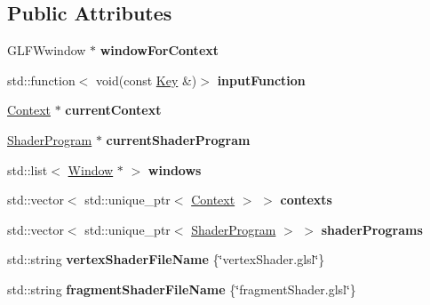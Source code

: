 \subsection*{Public Attributes}
\begin{DoxyCompactItemize}
\item 
G\+L\+F\+Wwindow $\ast$ {\bfseries window\+For\+Context}\hypertarget{classMyGL_ad9da207aec683d4e52190aa6ca4c8103}{}\label{classMyGL_ad9da207aec683d4e52190aa6ca4c8103}

\item 
std\+::function$<$ void(const \hyperlink{classKey}{Key} \&)$>$ {\bfseries input\+Function}\hypertarget{classMyGL_aa729ce3c2c4c45a960ae17ac53d46585}{}\label{classMyGL_aa729ce3c2c4c45a960ae17ac53d46585}

\item 
\hyperlink{classContext}{Context} $\ast$ {\bfseries current\+Context}\hypertarget{classMyGL_a64f2144f0057b9b37b14ebc9a94d4f75}{}\label{classMyGL_a64f2144f0057b9b37b14ebc9a94d4f75}

\item 
\hyperlink{classShaderProgram}{Shader\+Program} $\ast$ {\bfseries current\+Shader\+Program}\hypertarget{classMyGL_ae0a53010a55ec6920697018b90df6ee2}{}\label{classMyGL_ae0a53010a55ec6920697018b90df6ee2}

\item 
std\+::list$<$ \hyperlink{classWindow}{Window} $\ast$ $>$ {\bfseries windows}\hypertarget{classMyGL_ab7bc049b7ce8d79fe244a1dbd2e63bf0}{}\label{classMyGL_ab7bc049b7ce8d79fe244a1dbd2e63bf0}

\item 
std\+::vector$<$ std\+::unique\+\_\+ptr$<$ \hyperlink{classContext}{Context} $>$ $>$ {\bfseries contexts}\hypertarget{classMyGL_a349d4b9d76a0427c048ab86c75346c8f}{}\label{classMyGL_a349d4b9d76a0427c048ab86c75346c8f}

\item 
std\+::vector$<$ std\+::unique\+\_\+ptr$<$ \hyperlink{classShaderProgram}{Shader\+Program} $>$ $>$ {\bfseries shader\+Programs}\hypertarget{classMyGL_ad538dbfd1535c800bb09cab39e85226b}{}\label{classMyGL_ad538dbfd1535c800bb09cab39e85226b}

\item 
std\+::string {\bfseries vertex\+Shader\+File\+Name} \{\char`\"{}vertex\+Shader.\+glsl\char`\"{}\}\hypertarget{classMyGL_ae9b56982144e61ad3cdbd1941ece779c}{}\label{classMyGL_ae9b56982144e61ad3cdbd1941ece779c}

\item 
std\+::string {\bfseries fragment\+Shader\+File\+Name} \{\char`\"{}fragment\+Shader.\+glsl\char`\"{}\}\hypertarget{classMyGL_a8366fc1559f38d409baefeb5df9a1d59}{}\label{classMyGL_a8366fc1559f38d409baefeb5df9a1d59}

\end{DoxyCompactItemize}


